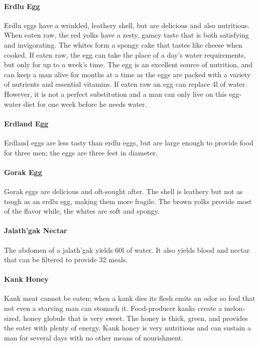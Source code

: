 \begin{multicols}{2}

\paragraph{Erdlu Egg} Erdlu eggs have a wrinkled, leathery shell, but are delicious and also nutritious. When eaten raw, the red yolks have a zesty, gamey taste that is both satisfying and invigorating. The whites form a spongy cake that tastes like cheese when cooked. If eaten raw, the egg can take the place of a day's water requirements, but only for up to a week's time. The egg is an excellent source of nutrition, and can keep a man alive for months at a time as the eggs are packed with a variety of nutrients and essential vitamins. If eaten raw an egg can replace 4l of water. However, it is not a perfect substitution and a man can only live on this egg-water diet for one week before he needs water.\\
\paragraph{Erdland Egg} Erdland eggs are less tasty than erdlu eggs, but are large enough to provide food for three men; the eggs are three feet in diameter.\\
\paragraph{Gorak Egg} Gorak eggs are delicious and oft-sought after. The shell is leathery but not as tough as an erdlu egg, making them more fragile. The brown yolks provide most of the flavor while, the whites are soft and spongy.\\
\paragraph{Jalath'gak Nectar} The abdomen of a jalath'gak yields 60l of water. It also yields blood and nectar that can be filtered to provide 32 meals.\\
\paragraph{Kank Honey} Kank meat cannot be eaten; when a kank dies its flesh emits an odor so foul that not even a starving man can stomach it. Food-producer kanks create a melon-sized, honey globule that is very sweet. The honey is thick, green, and provides the eater with plenty of energy. Kank honey is very nutritious and can sustain a man for several days with no other means of nourishment.\\

\end{multicols}
